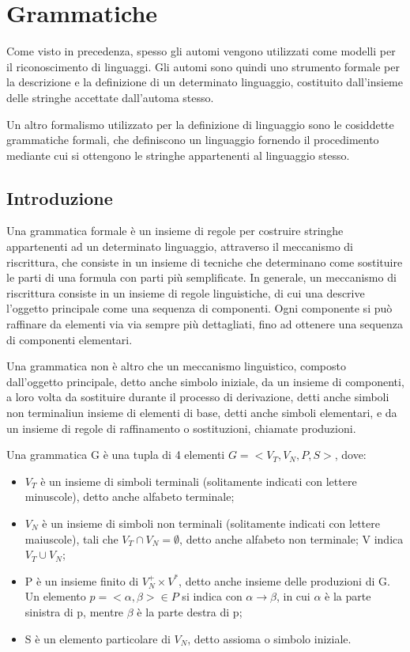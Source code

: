 \chapter{Grammatiche}
  Come visto in precedenza, spesso gli automi vengono utilizzati come modelli per il riconoscimento di linguaggi. Gli automi sono quindi uno strumento formale per la descrizione e la definizione di un determinato linguaggio, costituito dall'insieme delle stringhe accettate dall'automa stesso.

  Un altro formalismo utilizzato per la definizione di linguaggio sono le cosiddette grammatiche formali, che definiscono un linguaggio fornendo il procedimento mediante cui si ottengono le stringhe appartenenti al linguaggio stesso. 
  
  \section{Introduzione}

  Una grammatica formale è un insieme di regole per costruire stringhe appartenenti ad un determinato linguaggio, attraverso il meccanismo di riscrittura, che consiste in un insieme di tecniche che determinano come sostituire le parti di una formula con parti più semplificate. In generale, un meccanismo di riscrittura consiste in un insieme di regole linguistiche, di cui una descrive l'oggetto principale come una sequenza di componenti. Ogni componente si può raffinare da elementi via via sempre più dettagliati, fino ad ottenere una sequenza di componenti elementari.

  Una grammatica non è altro che un meccanismo linguistico, composto dall'oggetto principale, detto anche simbolo iniziale, da un insieme di componenti, a loro volta da sostituire durante il processo di derivazione, detti anche simboli non terminaliun insieme di elementi di base, detti anche simboli elementari, e da un insieme di regole di raffinamento o sostituzioni, chiamate produzioni.

  \begin{definition} \label{definizione grammatica}
    Una grammatica G è una tupla di 4 elementi \(G = <V_T, V_N, P, S>\), dove:
    \begin{itemize}
      \item \(V_T\) è un insieme di simboli terminali (solitamente indicati con lettere minuscole), detto anche alfabeto terminale;
      \item \(V_N\) è un insieme di simboli non terminali (solitamente indicati con lettere maiuscole), tali che \(V_T \cap V_N = \emptyset\), detto anche alfabeto non terminale; V indica \(V_T\cup V_N\);
      \item P è un insieme finito di \(V_N^+\times V^*\), detto anche insieme delle produzioni di G. Un elemento \(p=<\alpha, \beta> \in P\) si indica con \(\alpha\to\beta\), in cui \(\alpha\) è la parte sinistra di p, mentre \(\beta\) è la parte destra di p;
      \item S è un elemento particolare di \(V_N\), detto assioma o simbolo iniziale. 
    \end{itemize}
  \end{definition}

